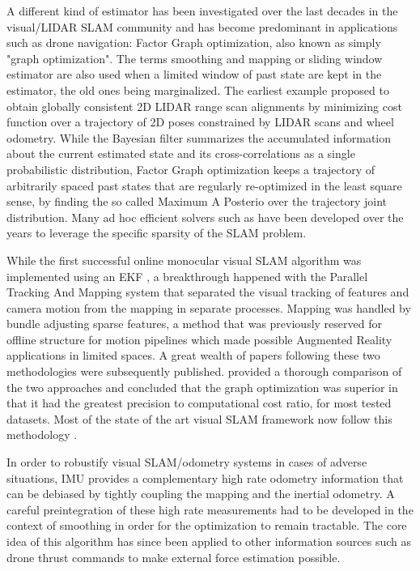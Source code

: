 A different kind of estimator has been investigated over the last decades in the visual/LIDAR SLAM community and has become predominant in applications
such as drone navigation: Factor Graph optimization, also known as simply "graph optimization". The terms smoothing and mapping or sliding window estimator are
also used when a limited window of past state are kept in the estimator, the old ones being marginalized. The earliest example \cite{lu1997globally} 
proposed to obtain globally consistent 2D LIDAR range scan alignments by minimizing cost function over a trajectory of 2D poses constrained by LIDAR scans and wheel odometry.
While the Bayesian filter summarizes the accumulated information about the current estimated state and its cross-correlations as a single probabilistic distribution, 
Factor Graph optimization keeps a trajectory of arbitrarily spaced past states that are regularly re-optimized in the least square sense, by finding the so called 
Maximum A Posterio over the trajectory joint distribution. Many ad hoc efficient solvers such as \cite{grisetti2011g2o, dellaert2012factor, ila2017slam++, ceres-solver} have been developed 
over the years to leverage the specific sparsity of the SLAM problem.

While the first successful online monocular visual SLAM algorithm was implemented using an EKF \cite{davison2007monoslam}, a breakthrough happened with the 
Parallel Tracking And Mapping system \cite{klein2009parallel} that separated the visual tracking of features and camera motion from the 
mapping in separate processes. Mapping was handled by bundle adjusting sparse features, a method that was previously reserved for offline 
structure for motion pipelines \cite{triggs1999bundle} which made possible Augmented Reality applications in limited spaces. 
A great wealth of papers following these two methodologies were subsequently published. \cite{strasdat2012visual} provided a thorough comparison 
of the two approaches and concluded that the graph optimization was superior in that it had the greatest precision to 
computational cost ratio, for most tested datasets. Most of the state of the art visual SLAM framework now follow this methodology 
\cite{forster2017-TRO, mur2015orb, qin2018vins, leutenegger2015keyframe, ferrera2021ov}.

In order to robustify visual SLAM/odometry systems in cases of adverse situations, IMU provides a complementary high rate odometry information that can 
be debiased by tightly coupling the mapping and the inertial odometry. A careful preintegration \cite{lupton-09,forster2017-TRO} of these high 
rate measurements had to be developed in the context of smoothing in order for the optimization to remain tractable. The core idea of this algorithm has 
since been applied to other information sources such as drone thrust commands \cite{nisar2019vimo} to make external force estimation possible.

